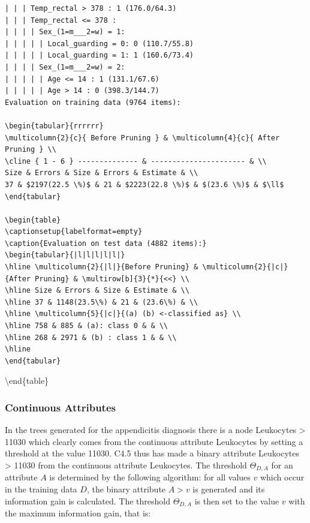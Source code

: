 \documentclass[10pt]{book}
\begin{document}
\begin{verbatim}
| | | Temp_rectal > 378 : 1 (176.0/64.3)
| | | Temp_rectal <= 378 :
| | | | Sex_(1=m___2=w) = 1:
| | | | | Local_guarding = 0: 0 (110.7/55.8)
| | | | | Local_guarding = 1: 1 (160.6/73.4)
| | | | Sex_(1=m___2=w) = 2:
| | | | | Age <= 14 : 1 (131.1/67.6)
| | | | | Age > 14 : 0 (398.3/144.7)
Evaluation on training data (9764 items):

\begin{tabular}{rrrrrr}
\multicolumn{2}{c}{ Before Pruning } & \multicolumn{4}{c}{ After Pruning } \\
\cline { 1 - 6 } -------------- & ---------------------- & \\
Size & Errors & Size & Errors & Estimate & \\
37 & $2197(22.5 \%)$ & 21 & $2223(22.8 \%)$ & $(23.6 \%)$ & $\ll$
\end{tabular}

\begin{table}
\captionsetup{labelformat=empty}
\caption{Evaluation on test data (4882 items):}
\begin{tabular}{|l|l|l|l|l|}
\hline \multicolumn{2}{|l|}{Before Pruning} & \multicolumn{2}{|c|}{After Pruning} & \multirow[b]{3}{*}{<<} \\
\hline Size & Errors & Size & Estimate & \\
\hline 37 & 1148(23.5\%) & 21 & (23.6\%) & \\
\hline \multicolumn{5}{|c|}{(a) (b) <-classified as} \\
\hline 758 & 885 & (a): class 0 & & \\
\hline 268 & 2971 & (b) : class 1 & & \\
\hline
\end{tabular}
\end{verbatim}

\textbackslash end\{table\}

\subsubsection*{Continuous Attributes}
In the trees generated for the appendicitis diagnosis there is a node Leukocytes > 11030 which clearly comes from the continuous attribute Leukocytes by setting a threshold at the value 11030. C4.5 thus has made a binary attribute Leukocytes > 11030 from the continuous attribute Leukocytes. The threshold $\Theta_{D, A}$ for an attribute $A$ is determined by the following algorithm: for all values $v$ which occur in the training data $D$, the binary attribute $A>v$ is generated and its information gain is calculated. The threshold $\Theta_{D, A}$ is then set to the value $v$ with the maximum information gain, that is:
\end{document}
